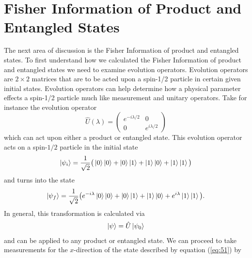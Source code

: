 \documentclass[twocolumn]{article}
\begin{document}
\section*{Fisher Information of Product and Entangled States}
The next area of discussion is the Fisher Information of product and entangled states. To first understand how we calculated the Fisher Information of product and entangled states we need to examine evolution operators. Evolution operators are $2\times2$ matrices that are to be acted upon a spin-1/2 particle in certain given initial states. Evolution operators can help determine how a physical parameter effects a spin-1/2 particle much like measurement and unitary operators. Take for instance the evolution operator
\begin{equation} \label{eq:49}
\hat{U}(\lambda)=
\begin{pmatrix}
e^{-i\lambda/2} & 0 \\
0 & e^{i\lambda/2}
\end{pmatrix}
\end{equation}
which can act upon either a product or entangled state. This evolution operator acts on a spin-$1/2$ particle in the initial state
\begin{equation} \label{eq:50}
\ket{\psi_i}=\frac{1}{\sqrt{2}}\big(\ket{0}\ket{0}+\ket{0}\ket{1}+\ket{1}\ket{0}+\ket{1}\ket{1}\big)
\end{equation}
and turns into the state
\begin{equation} \label{eq:51}
\ket{\psi_f}=\frac{1}{\sqrt{2}}\big(e^{-i\lambda}\ket{0}\ket{0}+\ket{0}\ket{1}+\ket{1}\ket{0}+e^{i\lambda}\ket{1}\ket{1}\big).
\end{equation}
In general, this transformation is calculated via
\begin{equation} \label{eq:52}
\ket{\psi}=\hat{U}\ket{\psi_0}
\end{equation}
and can be applied to any product or entangled state. We can proceed to take measurements for the $x$-direction of the state described by equation (\ref{eq:51}) by
\end{document}
